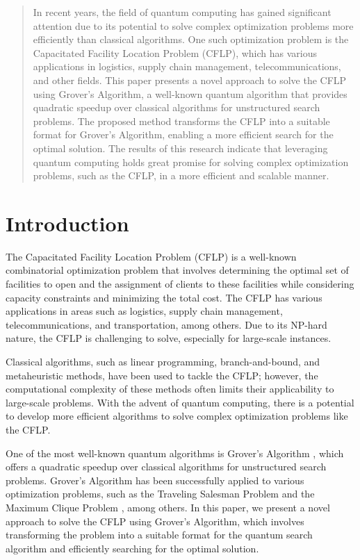 \begin{abstract}

In recent years, the field of quantum computing has gained significant attention due to its potential to solve complex optimization problems more efficiently than classical algorithms. One such optimization problem is the Capacitated Facility Location Problem (CFLP), which has various applications in logistics, supply chain management, telecommunications, and other fields. This paper presents a novel approach to solve the CFLP using Grover's Algorithm, a well-known quantum algorithm that provides quadratic speedup over classical algorithms for unstructured search problems. The proposed method transforms the CFLP into a suitable format for Grover's Algorithm, enabling a more efficient search for the optimal solution. The results of this research indicate that leveraging quantum computing holds great promise for solving complex optimization problems, such as the CFLP, in a more efficient and scalable manner.

\end{abstract}

\section{Introduction}

The Capacitated Facility Location Problem (CFLP) is a well-known combinatorial optimization problem that involves determining the optimal set of facilities to open and the assignment of clients to these facilities while considering capacity constraints and minimizing the total cost. The CFLP has various applications in areas such as logistics, supply chain management, telecommunications, and transportation, among others. Due to its NP-hard nature, the CFLP is challenging to solve, especially for large-scale instances.

Classical algorithms, such as linear programming, branch-and-bound, and metaheuristic methods, have been used to tackle the CFLP; however, the computational complexity of these methods often limits their applicability to large-scale problems. With the advent of quantum computing, there is a potential to develop more efficient algorithms to solve complex optimization problems like the CFLP.

One of the most well-known quantum algorithms is Grover's Algorithm \cite{grover1996fast}, which offers a quadratic speedup over classical algorithms for unstructured search problems. Grover's Algorithm has been successfully applied to various optimization problems, such as the Traveling Salesman Problem \cite{dunjko2006quantum} and the Maximum Clique Problem \cite{gupta2020quantum}, among others. In this paper, we present a novel approach to solve the CFLP using Grover's Algorithm, which involves transforming the problem into a suitable format for the quantum search algorithm and efficiently searching for the optimal solution.

